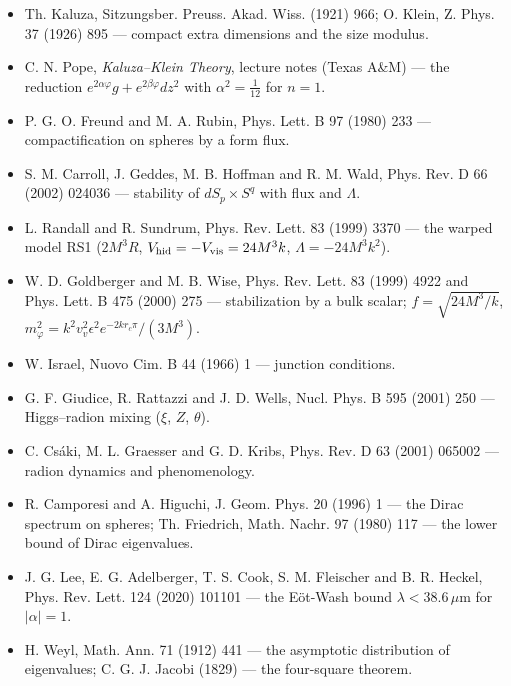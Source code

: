 \documentclass[10pt,a4paper]{article}
\begin{document}
\begin{itemize}
\item Th. Kaluza, Sitzungsber. Preuss. Akad. Wiss. (1921) 966; O. Klein, Z. Phys. 37 (1926) 895 — compact extra dimensions and the size modulus.
\item C. N. Pope, \emph{Kaluza–Klein Theory}, lecture notes (Texas A\&M) — the reduction $e^{2\alpha\varphi}g+e^{2\beta\varphi}dz^2$ with $\alpha^2=\frac1{12}$ for $n=1$.
\item P. G. O. Freund and M. A. Rubin, Phys. Lett. B 97 (1980) 233 — compactification on spheres by a form flux.
\item S. M. Carroll, J. Geddes, M. B. Hoffman and R. M. Wald, Phys. Rev. D 66 (2002) 024036 — stability of $dS_p\times S^q$ with flux and $\Lambda$.
\item L. Randall and R. Sundrum, Phys. Rev. Lett. 83 (1999) 3370 — the warped model RS1 ($2M^3R$, $V_{\rm hid}=-V_{\rm vis}=24M^3k$, $\Lambda=-24M^3k^2$).
\item W. D. Goldberger and M. B. Wise, Phys. Rev. Lett. 83 (1999) 4922 and Phys. Lett. B 475 (2000) 275 — stabilization by a bulk scalar; $f=\sqrt{24M^3/k}$, $m_\varphi^2=k^2v_v^2\epsilon^2e^{-2kr_c\pi}/(3M^3)$.
\item W. Israel, Nuovo Cim. B 44 (1966) 1 — junction conditions.
\item G. F. Giudice, R. Rattazzi and J. D. Wells, Nucl. Phys. B 595 (2001) 250 — Higgs–radion mixing ($\xi$, $Z$, $\theta$).
\item C. Csáki, M. L. Graesser and G. D. Kribs, Phys. Rev. D 63 (2001) 065002 — radion dynamics and phenomenology.
\item R. Camporesi and A. Higuchi, J. Geom. Phys. 20 (1996) 1 — the Dirac spectrum on spheres; Th. Friedrich, Math. Nachr. 97 (1980) 117 — the lower bound of Dirac eigenvalues.
\item J. G. Lee, E. G. Adelberger, T. S. Cook, S. M. Fleischer and B. R. Heckel, Phys. Rev. Lett. 124 (2020) 101101 — the Eöt-Wash bound $\lambda<38.6\,\mu$m for $|\alpha|=1$.
\item H. Weyl, Math. Ann. 71 (1912) 441 — the asymptotic distribution of eigenvalues; C. G. J. Jacobi (1829) — the four-square theorem.
\end{itemize}
\end{document}
